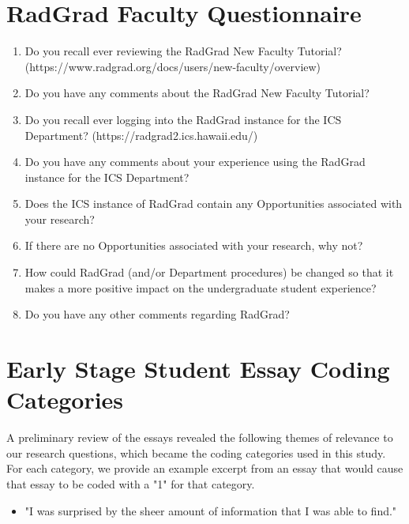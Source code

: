 \documentclass[acmsmall]{acmart}
\begin{document}
\section{RadGrad Faculty Questionnaire}
\label{sec:faculty-questionnaire}

\begin{enumerate}[leftmargin=*]
\item Do you recall ever reviewing the RadGrad New Faculty Tutorial? \newline (https://www.radgrad.org/docs/users/new-faculty/overview)
\item Do you have any comments about the RadGrad New Faculty Tutorial?
\item Do you recall ever logging into the RadGrad instance for the ICS Department? \newline (https://radgrad2.ics.hawaii.edu/)
\item Do you have any comments about your experience using the RadGrad instance for the ICS Department?
\item Does the ICS instance of RadGrad contain any Opportunities associated with your research?
\item If there are no Opportunities associated with your research, why not?
\item How could RadGrad (and/or Department procedures) be changed so that it makes a more positive impact on the undergraduate student experience?
\item Do you have any other comments regarding RadGrad?
\end{enumerate}

\section{Early Stage Student Essay Coding Categories}
\label{sec:coding-categories}

A preliminary review of the essays revealed the following themes of relevance to our research questions, which became the coding categories used in this study.  For each category, we provide an example excerpt from an essay that would cause that essay to be coded with a "1" for that category.

\begin{itemize}
\item "I was surprised by the sheer amount of information that I was able to find."
\end{itemize}
\end{document}
